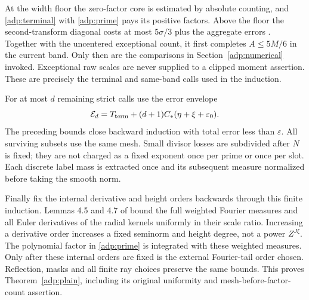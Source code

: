 At the width floor the zero-factor core is estimated by absolute
counting, and \eqref{adp:terminal} with \eqref{adp:prime} pays its
positive factors. Above the floor the second-transform diagonal
costs at most $5\sigma/3$ plus the aggregate errors
\cite[(18.31)]{OAI26}. Together with the uncentered exceptional
count, it first completes $A\le5M/6$ in the current band. Only then
are the comparisons in Section~\ref{adp:numerical} invoked.
Exceptional raw scales are never supplied to a clipped moment
assertion. These are precisely the terminal and same-band calls
used in the induction.

For at most $d$ remaining strict calls use the error envelope
\[
 \mathcal E_d=T_{\rm term}+
                   (d+1)C_*(\eta+\xi+\varepsilon_0).
\]
The preceding bounds close backward induction with total error
less than $\varepsilon$. All surviving subsets use the same mesh.
Small divisor losses are subdivided after $N$ is fixed; they are
not charged as a fixed exponent once per prime or once per slot.
Each discrete label mass is extracted once and its subsequent
measure normalized before taking the smooth norm.

Finally fix the internal derivative and height orders backwards
through this finite induction. Lemmas 4.5 and 4.7 of \cite{OAI26}
bound the full weighted Fourier measures and all Euler derivatives
of the radial kernels uniformly in their scale ratio. Increasing
a derivative order increases a fixed seminorm and height degree,
not a power $Z^{J\xi}$. The polynomial factor in \eqref{adp:prime}
is integrated with these weighted measures. Only after these
internal orders are fixed is the external Fourier-tail order
chosen. Reflection, masks and all finite ray choices preserve
the same bounds. This proves Theorem~\ref{adp:plain}, including
its original uniformity and mesh-before-factor-count assertion.
